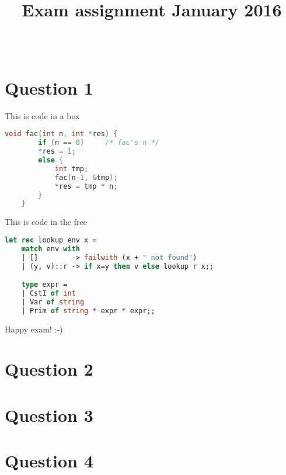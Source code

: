\documentclass{ituhandin}
\title{\Huge \textbf{\titlename} \\ \huge Exam assignment January 2016}
\author{\textsc{\name} \\ \textsc{\email}}
\begin{document}
%
\maketitle
\signpage

\chapter*{Question 1}

This is code in a box

\begin{lstlisting}[language=C, caption=This is a caption]
    void fac(int n, int *res) {
        if (n == 0)     /* fac's n */
        *res = 1;
        else {
            int tmp;
            fac(n-1, &tmp);
            *res = tmp * n;
        }
    }
\end{lstlisting}


This is code in the free

\begin{lstlisting}[language=ML, frame={}]
    let rec lookup env x =
    match env with 
    | []        -> failwith (x + " not found")
    | (y, v)::r -> if x=y then v else lookup r x;;

    type expr = 
    | CstI of int
    | Var of string
    | Prim of string * expr * expr;;
\end{lstlisting}


Happy exam! :-)


\chapter*{Question 2}
\chapter*{Question 3}
\chapter*{Question 4}

\label{LastPage}
\end{document}
